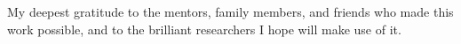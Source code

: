 \leavevmode\vfill
\begin{center}
My deepest gratitude to the mentors, family members, and friends who made this work possible,
and to the brilliant researchers I hope will make use of it.
\end{center}
\vfill